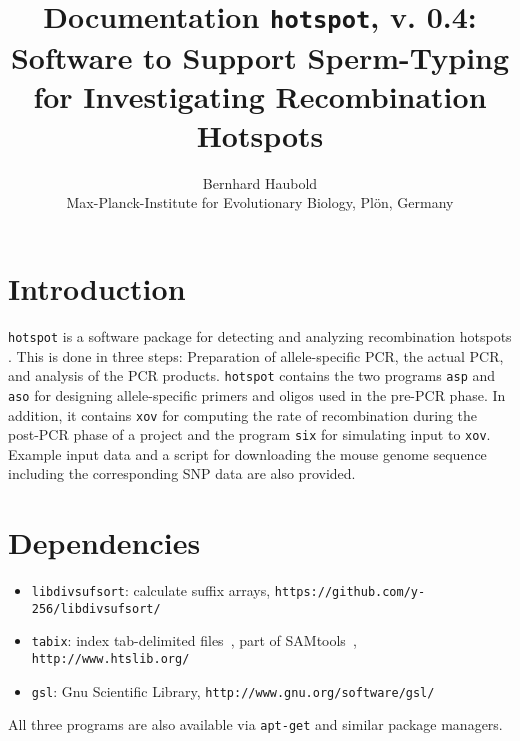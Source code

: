 \documentclass{article}
\newcommand{\bi}{\begin{itemize}}
\newcommand{\ei}{\end{itemize}}
\newcommand{\I}{\item}
\newcommand{\ty}{\texttt}
\newcommand{\version}{0.4}
\begin{document}
\title{Documentation \ty{hotspot}, v. \version: Software to Support Sperm-Typing for
Investigating Recombination Hotspots}
\author{Bernhard Haubold\\\small Max-Planck-Institute for Evolutionary Biology, Pl\"on, Germany}
\maketitle
\section{Introduction}
\ty{hotspot} is a software package for detecting and analyzing
recombination hotspots \cite{ode15:hot}. This is done in three steps:
Preparation of allele-specific PCR, the actual PCR, and analysis of
the PCR products. \ty{hotspot} contains the two programs \ty{asp} and \ty{aso} for designing
allele-specific primers and oligos used in the pre-PCR phase. In
addition, it contains \ty{xov} for computing the rate of recombination
during the post-PCR phase of a project and the program \ty{six} for simulating input to \ty{xov}. Example input data and a script for downloading the mouse
genome sequence including the corresponding SNP data are also provided.

\section{Dependencies}
\bi
\I \ty{libdivsufsort}: calculate suffix arrays, \ty{https://github.com/y-256/libdivsufsort/}
\I \ty{tabix}: index tab-delimited files~\cite{li10:tab}, part of SAMtools~\cite{li09:seq},
\ty{http://www.htslib.org/}
\I \ty{gsl}: Gnu Scientific Library, \ty{http://www.gnu.org/software/gsl/}
\ei
All three programs are also available via \ty{apt-get} and similar
package managers.
\end{document}
